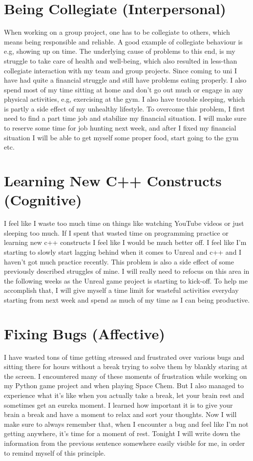 \documentclass{scrartcl}
\begin{document}
\section{Being Collegiate (Interpersonal)}

When working on a group project, one has to be collegiate to others, which means being responsible and reliable. A good example of collegiate behaviour is e.g, showing up on time. The underlying cause of problems to this end, is my struggle to take care of health and well-being, which also resulted in less-than collegiate interaction with my team and group projects. Since coming to uni I have had quite a financial struggle and still have problems eating properly. I also spend most of my time sitting at home and don't go out much or engage in any physical activities, e.g, exercising at the gym. I also have trouble sleeping, which is partly a side effect of my unhealthy lifestyle. To overcome this problem, I first need to find a part time job and stabilize my financial situation. I will make sure to reserve some time for job hunting next week, and after I fixed my financial situation I will be able to get myself some proper food, start going to the gym etc.

\section{Learning New C++ Constructs (Cognitive)}

I feel like I waste too much time on things like watching YouTube videos or just sleeping too much. If I spent that wasted time on programming practice or learning new c++ constructs I feel like I would be much better off. I feel like I'm starting to slowly start lagging behind when it comes to Unreal and c++ and I haven't got much practice recently. This problem is also a side effect of some previously described struggles of mine. I will really need to refocus on this area in the following weeks as the Unreal game project is starting to kick-off. To help me accomplish that, I will give myself a time limit for wasteful activities everyday starting from next week and spend as much of my time as I can being productive.

\section{Fixing Bugs (Affective)}

I have wasted tons of time getting stressed and frustrated over various bugs and sitting there for hours without a break trying to solve them by blankly staring at the screen. I encountered many of these moments of frustration while working on my Python game project and when playing Space Chem. But I also managed to experience what it's like when you actually take a break, let your brain rest and sometimes get an eureka moment. I learned how important it is to give your brain a break and have a moment to relax and sort your thoughts. Now I will make sure to always remember that, when I encounter a bug and feel like I'm not getting anywhere, it's time for a moment of rest. Tonight I will write down the information from the previous sentence somewhere easily visible for me, in order to remind myself of this principle.
\end{document}
